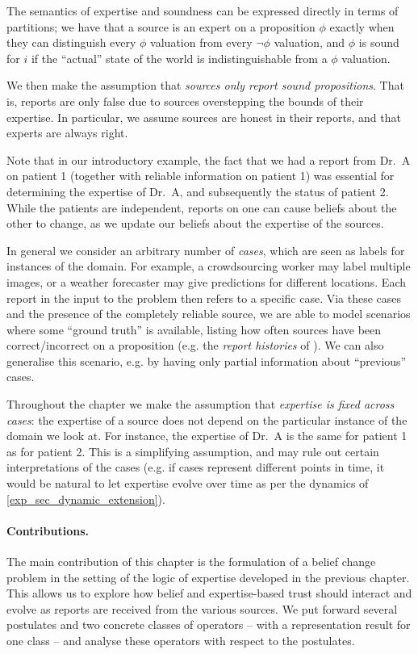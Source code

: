 The semantics of expertise and soundness can be expressed directly in terms of
partitions; we have that a source is an expert on a proposition $\phi$ exactly
when they can distinguish every $\phi$ valuation from every $\neg\phi$
valuation, and $\phi$ is sound for $i$ if the ``actual'' state of the world is
indistinguishable from a $\phi$ valuation.

We then make the assumption that \emph{sources only report sound propositions}.
That is, reports are only false due to sources overstepping the bounds of their
expertise. In particular, we assume sources are honest in their reports, and
that experts are always right.

Note that in our introductory example, the fact that we had a report from Dr.\ A
on patient 1 (together with reliable information on patient 1) was essential
for determining the expertise of Dr.\ A, and subsequently the status of patient
2. While the patients are independent, reports on one can cause beliefs about
the other to change, as we update our beliefs about the expertise of the
sources.

In general we consider an arbitrary number of \emph{cases}, which are
seen as labels for instances of the domain. For example, a crowdsourcing worker
may label multiple images, or a weather forecaster may give predictions for
different locations. Each report in the input to the
problem then refers to a specific case. Via these cases and the presence of the
completely reliable source, we are able to model scenarios where some ``ground
truth'' is available, listing how often sources have been correct/incorrect on a
proposition (e.g. the \emph{report histories} of
\textcite{hunter_building_21}). We can also generalise this scenario, e.g. by
having only partial information about ``previous'' cases.

Throughout the chapter we make the assumption that \emph{expertise is fixed
across cases}: the expertise of a source does not depend on the particular
instance of the domain we look at. For instance, the expertise of Dr.\ A is the
same for patient 1 as for patient 2. This is a simplifying assumption, and may
rule out certain interpretations of the cases (e.g. if cases represent
different points in time, it would be natural to let expertise evolve over
time as per the dynamics of \cref{exp_sec_dynamic_extension}).

\paragraph{Contributions.} The main contribution of this chapter is the
formulation of a belief change problem in the setting of the logic of expertise
developed in the previous chapter. This allows us to explore how belief and
expertise-based trust should interact and evolve as reports are received from
the various sources.  We put forward several postulates and two concrete
classes of operators -- with a representation result for one class -- and
analyse these operators with respect to the postulates.

